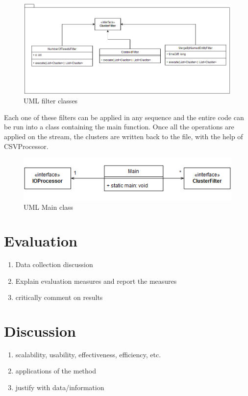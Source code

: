 \documentclass[a4paper,portrait,12pt]{article}
\begin{document}
\begin{figure}[h!]
    \centering
    \includegraphics[width=0.7\linewidth]{images/filterUML.png}
  \caption{UML filter classes}
  \label{fig:filterUML}
\end{figure}

Each one of these filters can be applied in any sequence and the entire code can be run into a class containing the main function.
Once all the operations are applied on the stream, the clusters are written back to the file, with the help of CSVProcessor.

\begin{figure}[h!]
    \centering
    \includegraphics[width=0.7\linewidth]{images/mainUML.png}
  \caption{UML Main class}
  \label{fig:mainUML}
\end{figure}

\section{Evaluation}
\begin{enumerate}
    \item Data collection discussion
    \item Explain evaluation measures and report the measures
    \item critically comment on results
\end{enumerate}

\section{Discussion}
\begin{enumerate}
    \item scalability, usability, effectiveness, efficiency, etc.
    \item applications of the method
    \item justify with data/information
\end{enumerate}
\end{document}
